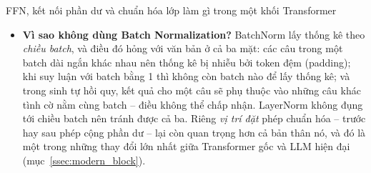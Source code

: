 \begin{deepdive}{FFN, kết nối phần dư và chuẩn hóa lớp làm gì trong một khối Transformer}
\begin{itemize}
\begin{itemize}
            \item \textbf{Vì sao không dùng Batch Normalization?} BatchNorm lấy thống kê theo \emph{chiều batch}, và điều đó hỏng với văn bản ở cả ba mặt: các câu trong một batch dài ngắn khác nhau nên thống kê bị nhiễu bởi token đệm (padding); khi suy luận với batch bằng 1 thì không còn batch nào để lấy thống kê; và trong sinh tự hồi quy, kết quả cho một câu sẽ phụ thuộc vào những câu khác tình cờ nằm cùng batch -- điều không thể chấp nhận. LayerNorm không đụng tới chiều batch nên tránh được cả ba. Riêng \emph{vị trí đặt} phép chuẩn hóa -- trước hay sau phép cộng phần dư -- lại còn quan trọng hơn cả bản thân nó, và đó là một trong những thay đổi lớn nhất giữa Transformer gốc và LLM hiện đại (mục~\ref{ssec:modern_block}).
        \end{itemize}
\end{itemize}
\end{deepdive}
